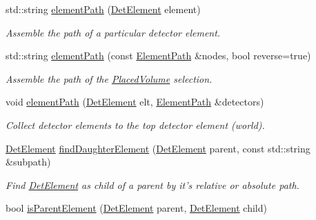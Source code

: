 \begin{DoxyCompactItemize}
std::string \hyperlink{namespace_d_d4hep_1_1_geometry_1_1_detector_tools_aa236d3ca69ed2eb4d7777db7c080216b}{elementPath} (\hyperlink{class_d_d4hep_1_1_geometry_1_1_det_element}{DetElement} element)
\begin{DoxyCompactList}\small\item\em Assemble the path of a particular detector element. \item\end{DoxyCompactList}\item 
std::string \hyperlink{namespace_d_d4hep_1_1_geometry_1_1_detector_tools_a67f5a1f1c0ed6ca5698a3323fc660379}{elementPath} (const \hyperlink{namespace_d_d4hep_1_1_geometry_1_1_detector_tools_a57c8f37a975258fd84676a69e74c56ab}{ElementPath} \&nodes, bool reverse=true)
\begin{DoxyCompactList}\small\item\em Assemble the path of the \hyperlink{class_d_d4hep_1_1_geometry_1_1_placed_volume}{PlacedVolume} selection. \item\end{DoxyCompactList}\item 
void \hyperlink{namespace_d_d4hep_1_1_geometry_1_1_detector_tools_a10418f7d98665f48f0dcb14a02919fea}{elementPath} (\hyperlink{class_d_d4hep_1_1_geometry_1_1_det_element}{DetElement} elt, \hyperlink{namespace_d_d4hep_1_1_geometry_1_1_detector_tools_a57c8f37a975258fd84676a69e74c56ab}{ElementPath} \&detectors)
\begin{DoxyCompactList}\small\item\em Collect detector elements to the top detector element (world). \item\end{DoxyCompactList}\item 
\hyperlink{class_d_d4hep_1_1_geometry_1_1_det_element}{DetElement} \hyperlink{namespace_d_d4hep_1_1_geometry_1_1_detector_tools_a142393e7b88829aee063f35a8e7cb984}{findDaughterElement} (\hyperlink{class_d_d4hep_1_1_geometry_1_1_det_element}{DetElement} parent, const std::string \&subpath)
\begin{DoxyCompactList}\small\item\em Find \hyperlink{class_d_d4hep_1_1_geometry_1_1_det_element}{DetElement} as child of a parent by it's relative or absolute path. \item\end{DoxyCompactList}\item 
bool \hyperlink{namespace_d_d4hep_1_1_geometry_1_1_detector_tools_a9e02ef062540b4e9c0d284f50106f203}{isParentElement} (\hyperlink{class_d_d4hep_1_1_geometry_1_1_det_element}{DetElement} parent, \hyperlink{class_d_d4hep_1_1_geometry_1_1_det_element}{DetElement} child)

\end{DoxyCompactItemize}
